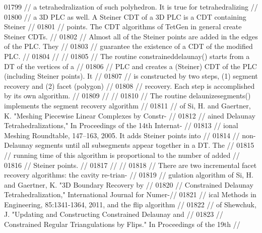 \begin{DoxyCode}
01799 \textcolor{comment}{// a tetrahedralization of such polyhedron.  It is true for tetrahedralizing //}
01800 \textcolor{comment}{// a 3D PLC as well. A Steiner CDT of a 3D PLC is a CDT containing Steiner   //}
01801 \textcolor{comment}{// points. The CDT algorithms of TetGen in general create Steiner CDTs.      //}
01802 \textcolor{comment}{// Almost all of the Steiner points are added in the edges of the PLC. They  //}
01803 \textcolor{comment}{// guarantee the existence of a CDT of the modified PLC.                     //}
01804 \textcolor{comment}{//                                                                           //}
01805 \textcolor{comment}{// The routine constraineddelaunay() starts from a DT of the vertices of a   //}
01806 \textcolor{comment}{// PLC and creates a (Steiner) CDT of the PLC (including Steiner points). It //}
01807 \textcolor{comment}{// is constructed by two steps, (1) segment recovery and (2) facet (polygon) //}
01808 \textcolor{comment}{// recovery. Each step is accomplished by its own algorithm.                 //}
01809 \textcolor{comment}{//                                                                           //}
01810 \textcolor{comment}{// The routine delaunizesegments() implements the segment recovery algorithm //}
01811 \textcolor{comment}{// of Si, H. and Gaertner, K. "Meshing Piecewise Linear Complexes by Constr- //}
01812 \textcolor{comment}{// ained Delaunay Tetrahedralizations," In Proceedings of the 14th Internat- //}
01813 \textcolor{comment}{// ional Meshing Roundtable, 147--163, 2005.  It adds Steiner points into    //}
01814 \textcolor{comment}{// non-Delaunay segments until all subsegments appear together in a DT. The  //}
01815 \textcolor{comment}{// running time of this algorithm is proportional to the number of added     //}
01816 \textcolor{comment}{// Steiner points.                                                           //}
01817 \textcolor{comment}{//                                                                           //}
01818 \textcolor{comment}{// There are two incremental facet recovery algorithms: the cavity re-trian- //}
01819 \textcolor{comment}{// gulation algorithm of Si, H. and Gaertner, K. "3D Boundary Recovery by    //}
01820 \textcolor{comment}{// Constrained Delaunay Tetrahedralization," International Journal for Numer-//}
01821 \textcolor{comment}{// ical Methods in Engineering, 85:1341-1364, 2011, and the flip algorithm   //}
01822 \textcolor{comment}{// of Shewchuk, J. "Updating and Constructing Constrained Delaunay and       //}
01823 \textcolor{comment}{// Constrained Regular Triangulations by Flips." In Proceedings of the 19th  //}

\end{DoxyCode}
